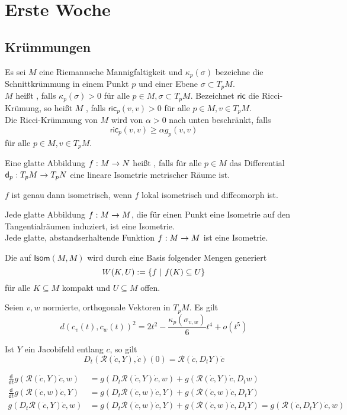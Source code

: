 \documentclass{book}
\renewcommand{\d}{\textsf{d}}
\newcommand{\Rc}{\mathcal{R}}
\newcommand{\ric}{\textsf{ric}}
\begin{document}
\chapter{Erste Woche}
\section{Krümmungen}

\Def{}
Es sei $M$ eine Riemannsche Mannigfaltigkeit und $\kappa_p(\sigma)$ bezeichne die Schnittkrümmung in einem Punkt $p$ und einer Ebene $\sigma \subset T_pM$.\\
$M$ heißt , falls $\kappa_p(\sigma) > 0$ für alle $p \in M, \sigma \subset T_pM$.
Bezeichnet $\ric$ die Ricci-Krümung, so heißt $M$ , falls $\ric_p(v,v) > 0$ für alle $p \in M, v \in T_pM$.\\
Die Ricci-Krümmung von $M$ wird von $\alpha > 0$ nach unten beschränkt, falls
\[ \ric_p(v,v) \geq \alpha g_p(v,v) \]
für alle $p \in M, v \in T_pM$.

Eine glatte Abbildung $f : M \overset{}{\rightarrow} N$ heißt , falls für alle $p \in M$ das Differential $\d_p : T_pM \pfeil{} T_pN$ eine lineare Isometrie metrischer Räume ist.

\Bem{}
$f$ ist genau dann isometrisch, wenn $f$ lokal isometrisch und diffeomorph ist.

\Satz{}
Jede glatte Abbildung $f : M \overset{}{\rightarrow} M$, die für einen Punkt eine Isometrie auf den Tangentialräumen induziert, ist eine Isometrie.\\
Jede glatte, abstandserhaltende Funktion $f : M \overset{}{\rightarrow} M$ ist eine Isometrie.

\Def{}
Die  auf $\textsf{Isom}(M,M)$ wird durch eine Basis folgender Mengen generiert
\[ W(K,U) := \set{f}{ f(K) \subseteq U } \]
für alle $K \subseteq M$ kompakt und $ U \subseteq M$ offen.

Seien $v,w$ normierte, orthogonale Vektoren in $T_pM$. Es gilt
\[ d(c_v(t), c_w(t))^2 = 2t^2 - \frac{\kappa_p(\sigma_{v,w})}{6} t^4 + o(t^5)  \]

\Lem{}
Ist $Y$ ein Jacobifeld entlang $c$, so gilt
\[ D_t(\Rc (\dot{c}, Y), \dot{c})(0) = \Rc (\dot{c}, D_tY)\dot{c}  \]
\begin{Beweis}{}
\begin{align*}
\frac{\d}{\d t} g(\Rc(\dot{c} , Y) \dot{c}, w ) &= g(D_t \Rc(\dot{c}, Y) \dot{c}, w ) + g(\Rc (\dot{c}, Y) \dot{c}, D_tw )\\
\frac{\d}{\d t} g(\Rc(\dot{c} , w) \dot{c}, Y ) &= g(D_t \Rc(\dot{c}, w) \dot{c}, Y ) + g(\Rc (\dot{c}, w) \dot{c}, D_tY )\\
g(D_t \Rc(\dot{c}, Y) \dot{c}, w ) &= g(D_t \Rc(\dot{c}, w) \dot{c}, Y ) + g(\Rc(\dot{c}, w) \dot{c}, D_tY ) =  g(\Rc(\dot{c}, D_tY) \dot{c}, w )
\end{align*}
\end{Beweis}
\end{document}
